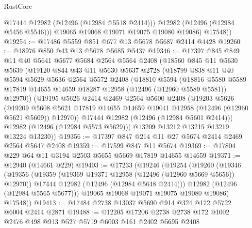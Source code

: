 \begin{lexlean}{RustCore}
\begin{coremodule}
              @17444
              @12982
              (@12496 (@12984 @5518 @2414)))
            @12982
            (@12496 (@12984 @5456 @5546)))
          @19065
          @19068
          @19071
          @19075
          @19080
          @19086)
        @17548))
@19254 := @17486 @5559 @851 @677 @13 @5678 @5687 @2414 @4428
@19260 := @18976 @850 @43 @13 @5678 @5685 @5437
@19346 := @17397
    @845
    @849
    @11
    @40
    @5641
    @5677
    @5684
    @2564
    @5564
    @2408
    (@18560
      @845
      @11
      @5630
      @5639
      (@19120
        @844
        @43
        @11
        @5630
        @5637
        @2728
        (@18799
          @838
          @11
          @40
          @5594
          @5629
          @5636
          @2564
          @5572
          @2408
          (@18810
            @5594
            (@18816
              @5580
              @5589
              @17819
              @14655
              @14659
              @18287
              @12958
              (@12496 (@12960 @5589 @5581))
              @12970))
          (@19195
            @5626
            @2414
            @2469
            @2564
            @5600
            @2408
            (@19203
              @5626
              (@19209
                @5608
                @5621
                @17819
                @14655
                @14659
                @19041
                @12958
                (@12496 (@12960 @5621 @5609))
                @12970))
            @17444
            @12982
            (@12496 (@12984 @5601 @2414)))
          @12982
          (@12496 (@12984 @5573 @5629)))
        @13209
        @13212
        @13215
        @13219
        @13224
        @13230))
@19356 := @17397 @847 @214 @11 @27 @5674 @2414 @2469 @2564 @5647 @2408
@19359 := @17599 @847 @11 @5674
@19369 := @17804 @229 @64 @11 @3194 @2503 @5655 @5669 @17819 @14655 @14659
@19371 := @12940 (@14661 @229)
@19403 := @17233
    (@19246
      (@19254
        (@19260
          (@19346
            (@19356
              (@19359 (@19369 @19371 @12958 (@12496 (@12960 @5669 @5656)) @12970))
              @17444
              @12982
              (@12496 (@12984 @5648 @2414)))
            @12982
            (@12496 (@12984 @5565 @5677)))
          @19065
          @19068
          @19071
          @19075
          @19080
          @19086)
        @17548))
@19413 := @17484 @2738 @13037 @5690 @914 @324 @172 @5722 @6004 @2414 @2871
@19488 := @12205
    @17206
    @2738
    @2738
    @172
    @1002
    @2476
    @498
    @913
    @527
    @5719
    @6003
    @161
    @2402
    @5695
    @2408

\end{coremodule}
\end{lexlean}
